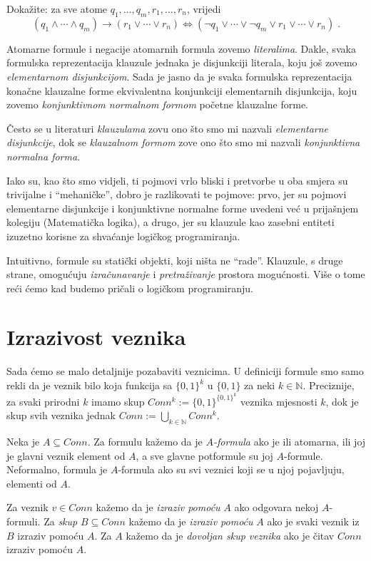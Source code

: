 \begin{zadatak}\label{zad:clfcnf}
	Dokažite: za sve atome $q_1,\ldots,q_m,r_1,\ldots,r_n$, vrijedi
	$$(q_1\wedge\cdots\wedge q_m)\to(r_1\vee\cdots\vee r_n)
	\Longleftrightarrow
	(\neg q_1\vee\cdots\vee\neg q_m\vee r_1\vee\cdots\vee r_n)\;.
	$$
\end{zadatak}

\begin{definicija}
	Atomarne formule i negacije atomarnih formula zovemo \emph{literalima}.
	Dakle, svaka formulska reprezentacija klauzule jednaka je disjunkciji literala, koju još zovemo \emph{elementarnom disjunkcijom}. Sada je jasno da je svaka formulska reprezentacija konačne klauzalne forme ekvivalentna konjunkciji elementarnih disjunkcija, koju zovemo \emph{konjunktivnom normalnom formom} početne klauzalne forme.
\end{definicija}

\begin{napomena}
	Često se u literaturi \emph{klauzulama} zovu ono što smo mi nazvali \emph{elementarne disjunkcije}, dok se \emph{klauzalnom formom} zove ono što smo mi nazvali \emph{konjunktivna normalna forma}. 
	
	Iako su, kao što smo vidjeli, ti pojmovi vrlo bliski i pretvorbe u oba smjera su trivijalne i \enquote{mehaničke}, dobro je razlikovati te pojmove: prvo, jer su pojmovi elementarne disjunkcije i konjunktivne normalne forme uvedeni već u prijašnjem kolegiju (Matematička logika), a drugo, jer su klauzule kao zasebni entiteti izuzetno korisne za shvaćanje logičkog programiranja.
	
	Intuitivno, formule su statički objekti, koji ništa ne \enquote{rade}. Klauzule, s druge strane, omogućuju \emph{izračunavanje} i \emph{pretraživanje} prostora mogućnosti. Više o tome reći ćemo kad budemo pričali o logičkom programiranju.
\end{napomena}

\section{Izrazivost veznika}
Sada ćemo se malo detaljnije pozabaviti veznicima. U definiciji formule smo samo rekli da je veznik bilo koja funkcija sa $\{0,1\}^k$ u $\{0,1\}$ za neki $k\in\mathbb N$. Preciznije, za svaki prirodni $k$ imamo skup $Conn^k:=\{0,1\}^{\{0,1\}^k}$ veznika mjesnosti $k$, dok je skup svih veznika jednak $Conn:=\bigcup_{k\in\mathbb N}Conn^k$.

\begin{definicija}
Neka je $A\subseteq Conn$. Za formulu kažemo da je $A$\emph{-formula} ako je ili atomarna, ili joj je glavni veznik element od $A$, a sve glavne potformule su joj $A$-formule. Neformalno, formula je $A$-formula ako su svi veznici koji se u njoj pojavljuju, elementi od $A$.
	
Za veznik $v\in Conn$ kažemo da je \emph{izraziv pomoću} $A$ ako odgovara nekoj $A$-formuli. Za \emph{skup} $B\subseteq Conn$ kažemo da je \emph{izraziv pomoću} $A$ ako je svaki veznik iz $B$ izraziv pomoću $A$. Za $A$ kažemo da je \emph{dovoljan skup veznika} ako je čitav $Conn$ izraziv pomoću $A$.
\end{definicija}

